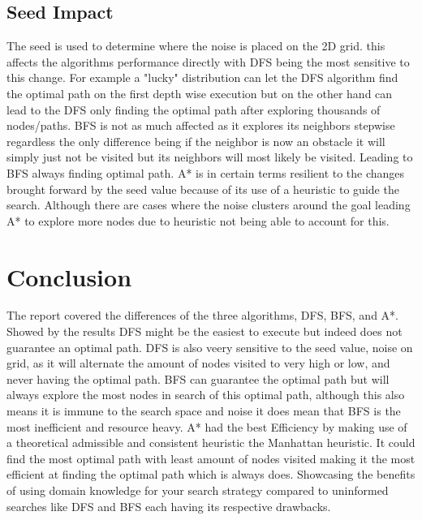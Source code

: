 \documentclass[12pt,a4paper]{article}
\begin{document}
\subsection{Seed Impact}
   The seed is used to determine where the noise is placed on the 2D grid. this affects the algorithms performance directly with DFS being the most sensitive to this change.
   For example a "lucky" distribution can let the DFS algorithm find the optimal path on the first depth wise execution but on the other hand can lead to the DFS only finding the optimal path
   after exploring thousands of nodes/paths. BFS is not as much affected as it explores its neighbors stepwise regardless the only difference being if the neighbor is now an obstacle it will 
   simply just not be visited but its neighbors will most likely be visited. Leading to BFS always finding optimal path.
   A* is in certain terms resilient to the changes brought forward by the seed value because of its use of a heuristic to guide the search. Although there are cases where the noise
   clusters around the goal leading A* to explore more nodes due to heuristic not being able to account for this.

\section{Conclusion}
  The report covered the differences of the three algorithms, DFS, BFS, and A*. Showed by the results DFS might be the easiest to execute but indeed does not guarantee an optimal path.
  DFS is also veery sensitive to the seed value, noise on grid, as it will alternate the amount of nodes visited to very high or low, and never having the optimal path.
  BFS can guarantee the optimal path but will always explore the most nodes in search of this optimal path, although this also means it is immune to the search space and noise it does
  mean that BFS is the most inefficient and resource heavy. A* had the best Efficiency by making use of a theoretical admissible and consistent heuristic the Manhattan heuristic.
  It could find the most optimal path with least amount of nodes visited making it the most efficient at finding the optimal path which is always does. Showcasing the benefits of using domain
  knowledge for your search strategy compared to uninformed searches like DFS and BFS each having its respective drawbacks.
\end{document}
